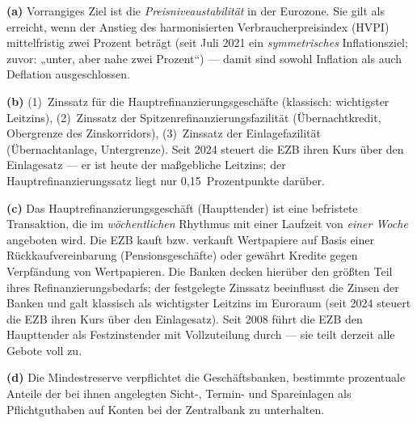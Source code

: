 \documentclass[11pt, a4paper]{article}
\begin{document}
\begin{loesung}[title={Lösung Aufgabe~2 --- Ziele und Instrumente der EZB}]
\textbf{(a)} Vorrangiges Ziel ist die \emph{Preisniveaustabilität} in der Eurozone. Sie
gilt als erreicht, wenn der Anstieg des harmonisierten Verbraucherpreisindex (HVPI)
mittelfristig zwei Prozent beträgt (seit Juli 2021 ein \emph{symmetrisches}
Inflationsziel; zuvor: „unter, aber nahe zwei Prozent``) --- damit sind sowohl Inflation
als auch Deflation ausgeschlossen.

\textbf{(b)} (1)~Zinssatz für die Hauptrefinanzierungsgeschäfte (klassisch: wichtigster Leitzins),
(2)~Zinssatz der Spitzenrefinanzierungsfazilität (Übernachtkredit, Obergrenze des
Zinskorridors), (3)~Zinssatz der Einlagefazilität (Übernachtanlage, Untergrenze). Seit 2024
steuert die EZB ihren Kurs über den Einlagesatz --- er ist heute der maßgebliche Leitzins;
der Hauptrefinanzierungssatz liegt nur 0,15~Prozentpunkte darüber.

\textbf{(c)} Das Hauptrefinanzierungsgeschäft (Haupttender) ist eine befristete
Transaktion, die im \emph{wöchentlichen} Rhythmus mit einer Laufzeit von \emph{einer
Woche} angeboten wird. Die EZB kauft bzw. verkauft Wertpapiere auf Basis einer
Rückkaufvereinbarung (Pensionsgeschäfte) oder gewährt Kredite gegen Verpfändung von
Wertpapieren. Die Banken decken hierüber den größten Teil ihres Refinanzierungsbedarfs;
der festgelegte Zinssatz beeinflusst die Zinsen der Banken und galt klassisch als
wichtigster Leitzins im Euroraum (seit 2024 steuert die EZB ihren Kurs über den
Einlagesatz). Seit 2008 führt die EZB den Haupttender als Festzinstender mit
Vollzuteilung durch --- sie teilt derzeit alle Gebote voll zu.

\textbf{(d)} Die Mindestreserve verpflichtet die Geschäftsbanken, bestimmte prozentuale
Anteile der bei ihnen angelegten Sicht-, Termin- und Spareinlagen als Pflichtguthaben auf
Konten bei der Zentralbank zu unterhalten.
\end{loesung}
\end{document}
